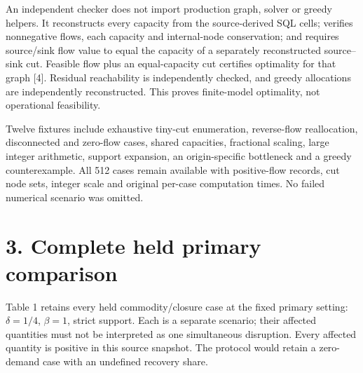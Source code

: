 \documentclass[11pt]{article}
\begin{document}
An independent checker does not import production graph, solver or greedy helpers. It reconstructs every capacity from the source-derived SQL cells; verifies nonnegative flows, each capacity and internal-node conservation; and requires source/sink flow value to equal the capacity of a separately reconstructed source--sink cut. Feasible flow plus an equal-capacity cut certifies optimality for that graph [4]. Residual reachability is independently checked, and greedy allocations are independently reconstructed. This proves finite-model optimality, not operational feasibility.

Twelve fixtures include exhaustive tiny-cut enumeration, reverse-flow reallocation, disconnected and zero-flow cases, shared capacities, fractional scaling, large integer arithmetic, support expansion, an origin-specific bottleneck and a greedy counterexample. All 512 cases remain available with positive-flow records, cut node sets, integer scale and original per-case computation times. No failed numerical scenario was omitted.

\newpage
\section*{3. Complete held primary comparison}
Table 1 retains every held commodity/closure case at the fixed primary setting: $\delta=1/4$, $\beta=1$, strict support. Each is a separate scenario; their affected quantities must not be interpreted as one simultaneous disruption. Every affected quantity is positive in this source snapshot. The protocol would retain a zero-demand case with an undefined recovery share.
\end{document}

